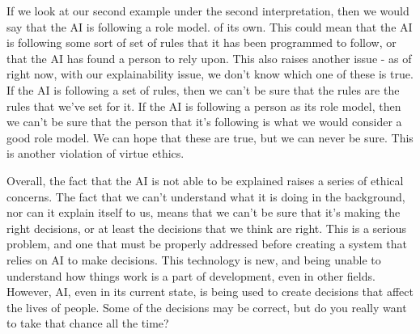 \documentclass[12pt]{article}
\begin{document}
    If we look at our second example under the second interpretation, then we would say that the AI is following a role model.
    of its own. This could mean that the AI is following some sort of set of rules that it has been programmed to follow, or that
    the AI has found a person to rely upon. This also raises another issue - as of right now, with our explainability issue, we
    don't know which one of these is true. If the AI is following a set of rules, then we can't be sure that the rules are
    the rules that we've set for it. If the AI is following a person as its role model, then we can't be sure that the person
    that it's following is what we would consider a good role model. We can hope that these are true, but we can never be sure.
    This is another violation of virtue ethics.

    Overall, the fact that the AI is not able to be explained raises a series of ethical concerns. The fact that we can't
    understand what it is doing in the background, nor can it explain itself to us, means that we can't be sure that it's
    making the right decisions, or at least the decisions that we think are right. This is a serious problem, and one that
    must be properly addressed before creating a system that relies on AI to make decisions. This technology is new, and
    being unable to understand how things work is a part of development, even in other fields. However, AI, even in its
    current state, is being used to create decisions that affect the lives of people. Some of the decisions may be correct,
    but do you really want to take that chance all the time?

    \clearpage
    \printbibliography{}
\end{document}
